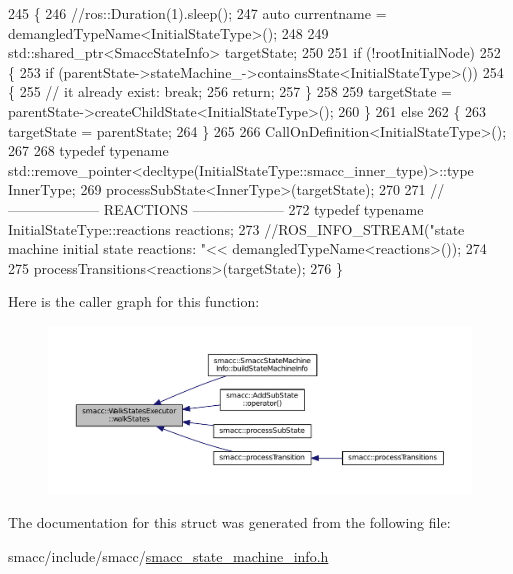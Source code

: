 \begin{DoxyCode}
245 \{
246     \textcolor{comment}{//ros::Duration(1).sleep();}
247     \textcolor{keyword}{auto} currentname = demangledTypeName<InitialStateType>();
248 
249     std::shared\_ptr<SmaccStateInfo> targetState;
250 
251     \textcolor{keywordflow}{if} (!rootInitialNode)
252     \{
253         \textcolor{keywordflow}{if} (parentState->stateMachine\_->containsState<InitialStateType>())
254         \{
255             \textcolor{comment}{// it already exist: break;}
256             \textcolor{keywordflow}{return};
257         \}
258 
259         targetState = parentState->createChildState<InitialStateType>();
260     \}
261     \textcolor{keywordflow}{else}
262     \{
263         targetState = parentState;
264     \}
265     
266     CallOnDefinition<InitialStateType>();
267 
268     \textcolor{keyword}{typedef} \textcolor{keyword}{typename} std::remove\_pointer<decltype(InitialStateType::smacc\_inner\_type)>::type InnerType;
269     processSubState<InnerType>(targetState);
270 
271     \textcolor{comment}{// -------------------- REACTIONS --------------------}
272     \textcolor{keyword}{typedef} \textcolor{keyword}{typename} InitialStateType::reactions reactions;
273     \textcolor{comment}{//ROS\_INFO\_STREAM("state machine initial state reactions: "<< demangledTypeName<reactions>());}
274 
275     processTransitions<reactions>(targetState);
276 \}
\end{DoxyCode}


Here is the caller graph for this function\+:
\nopagebreak
\begin{figure}[H]
\begin{center}
\leavevmode
\includegraphics[width=350pt]{structsmacc_1_1WalkStatesExecutor_a11a2b02eafb62ec298bcf5ffbb32848b_icgraph}
\end{center}
\end{figure}




The documentation for this struct was generated from the following file\+:\begin{DoxyCompactItemize}
\item 
smacc/include/smacc/\hyperlink{smacc__state__machine__info_8h}{smacc\+\_\+state\+\_\+machine\+\_\+info.\+h}\end{DoxyCompactItemize}
